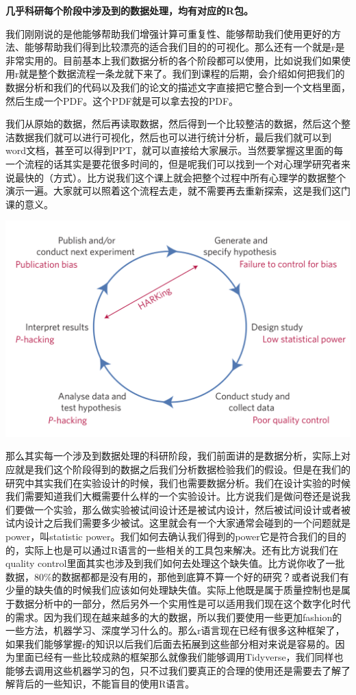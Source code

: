 \documentclass[
  oneside]{book}
\begin{document}
\textbf{几乎科研每个阶段中涉及到的数据处理，均有对应的R包。}

我们刚刚说的是他能够帮助我们增强计算可重复性、能够帮助我们使用更好的方法、能够帮助我们得到比较漂亮的适合我们目的的可视化。那么还有一个就是r是非常实用的。目前基本上我们数据分析的各个阶段都可以使用，比如说我们如果使用r就是整个数据流程一条龙就下来了。我们到课程的后期，会介绍如何把我们的数据分析和我们的代码以及我们的论文的描述文字直接把它整合到一个文档里面，然后生成一个PDF。这个PDF就是可以拿去投的PDF。

我们从原始的数据，然后再读取数据，然后得到一个比较整洁的数据，然后这个整洁数据我们就可以进行可视化，然后也可以进行统计分析，最后我们就可以到word文档，甚至可以得到PPT，就可以直接给大家展示。当然要掌握这里面的每一个流程的话其实是要花很多时间的，但是呢我们可以找到一个对心理学研究者来说最快的（方式）。比方说我们这个课上就会把整个过程中所有心理学的数据整个演示一遍。大家就可以照着这个流程去走，就不需要再去重新探索，这是我们这门课的意义。

\includegraphics{1001-lesson1/image-20230302200230583.png}

那么其实每一个涉及到数据处理的科研阶段，我们前面讲的是数据分析，实际上对应就是我们这个阶段得到的数据之后我们分析数据检验我们的假设。但是在我们的研究中其实我们在实验设计的时候，我们也需要数据分析。我们在设计实验的时候我们需要知道我们大概需要什么样的一个实验设计。比方说我们是做问卷还是说我们要做一个实验，那么做实验被试间设计还是被试内设计，然后被试间设计或者被试内设计之后我们需要多少被试。这里就会有一个大家通常会碰到的一个问题就是power，叫statistic
power。我们如何去确认我们得到的power它是符合我们的目的的，实际上也是可以通过R语言的一些相关的工具包来解决。还有比方说我们在quality
control里面其实也涉及到我们如何去处理这个缺失值。比方说你收了一批数据，80\%的数据都都是没有用的，那他到底算不算一个好的研究？或者说我们有少量的缺失值的时候我们应该如何处理缺失值。实际上他既是属于质量控制也是属于数据分析中的一部分，然后另外一个实用性是可以适用我们现在这个数字化时代的需求。因为我们现在越来越多的大的数据，所以我们要使用一些更加fashion的一些方法，机器学习、深度学习什么的。那么r语言现在已经有很多这种框架了，如果我们能够掌握r的知识以后我们后面去拓展到这些部分相对来说是容易的。因为里面已经有一些比较成熟的框架那么就像我们能够调用Tidyverse，我们同样也能够去调用这些机器学习的包，只不过我们要真正的合理的使用还是需要去了解了解背后的一些知识，不能盲目的使用R语言。
\end{document}
